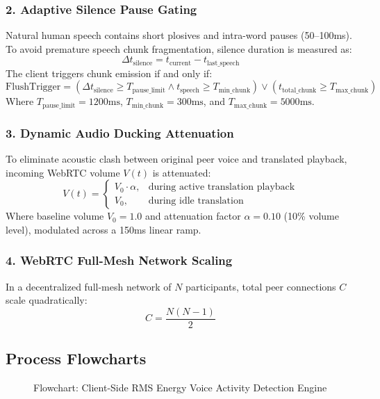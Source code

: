 \documentclass[12pt,a4paper]{report}
\begin{document}
\subsubsection{2. Adaptive Silence Pause Gating}
Natural human speech contains short plosives and intra-word pauses (50--100ms). To avoid premature speech chunk fragmentation, silence duration is measured as:
\begin{equation}
\Delta t_{\text{silence}} = t_{\text{current}} - t_{\text{last\_speech}}
\end{equation}
The client triggers chunk emission if and only if:
\begin{equation}
\text{FlushTrigger} = (\Delta t_{\text{silence}} \ge T_{\text{pause\_limit}} \land t_{\text{speech}} \ge T_{\text{min\_chunk}}) \lor (t_{\text{total\_chunk}} \ge T_{\text{max\_chunk}})
\end{equation}
Where $T_{\text{pause\_limit}} = 1200\text{ms}$, $T_{\text{min\_chunk}} = 300\text{ms}$, and $T_{\text{max\_chunk}} = 5000\text{ms}$.

\subsubsection{3. Dynamic Audio Ducking Attenuation}
To eliminate acoustic clash between original peer voice and translated playback, incoming WebRTC volume $V(t)$ is attenuated:
\begin{equation}
V(t) = \begin{cases}
V_0 \cdot \alpha, & \text{during active translation playback} \\
V_0, & \text{during idle translation}
\end{cases}
\end{equation}
Where baseline volume $V_0 = 1.0$ and attenuation factor $\alpha = 0.10$ (10\% volume level), modulated across a 150ms linear ramp.

\subsubsection{4. WebRTC Full-Mesh Network Scaling}
In a decentralized full-mesh network of $N$ participants, total peer connections $C$ scale quadratically:
\begin{equation}
C = \frac{N(N - 1)}{2}
\end{equation}

\subsection{Process Flowcharts}
\begin{figure}[H]
  \centering
  \caption{Flowchart: Client-Side RMS Energy Voice Activity Detection Engine}
  \label{fig:fig4_10}
\end{figure}
\end{document}
